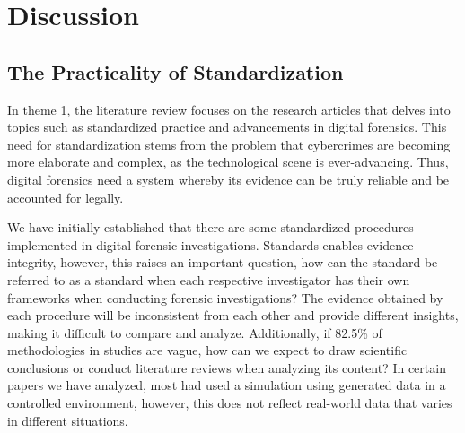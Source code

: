 \documentclass[12pt,a4paper]{article}
\begin{document}

\section{Discussion}





\subsection{The Practicality of Standardization}

In theme 1, the literature review focuses on the research articles that delves into topics such as standardized practice and advancements in digital forensics. This need for standardization stems from the problem that cybercrimes are becoming more elaborate and complex, as the technological scene is ever-advancing. Thus, digital forensics need a system whereby its evidence can be truly reliable and be accounted for legally.  

We have initially established that there are some standardized procedures implemented in digital forensic investigations. Standards enables evidence integrity, however, this raises an important question, how can the standard be referred to as a standard when each respective investigator has their own frameworks when conducting forensic investigations? The evidence obtained by each procedure will be inconsistent from each other and provide different insights, making it difficult to compare and analyze. Additionally, if 82.5\% of methodologies in studies are vague, how can we expect to draw scientific conclusions or conduct literature reviews when analyzing its content? In certain papers we have analyzed, most had used a simulation using generated data in a controlled environment, however, this does not reflect real-world data that varies in different situations. 
\end{document}
